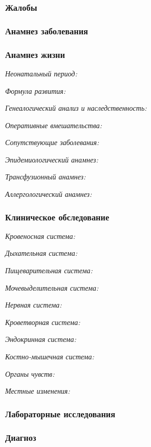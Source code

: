\documentclass[a4paper,14pt]{extarticle}
\begin{document}
\subsubsection*{Жалобы}

\subsubsection*{Анамнез заболевания}

\subsubsection*{Анамнез жизни}

\emph{Неонатальный период:}

\emph{Формула развития:}

\emph{Генеалогический анализ и наследственность:}

\emph{Оперативные вмешательства:}

\emph{Сопутствующие заболевания:}

\emph{Эпидемиологический анамнез:}

\emph{Трансфузионный анамнез:}

\emph{Аллергологический анамнез:}

\subsubsection*{Клиническое обследование}

\emph{Кровеносная система:}

\emph{Дыхательная система:}

\emph{Пищеварительная система:}

\emph{Мочевыделительная система:}

\emph{Нервная система:} 

\emph{Кроветворная система:}

\emph{Эндокринная система:}

\emph{Костно-мышечная система:}

\emph{Органы чувств:}

\emph{Местные изменения:}

\subsubsection*{Лабораторные исследования}

\subsubsection*{Диагноз}
\end{document}
